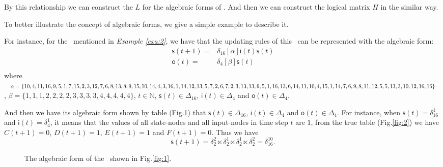 
By this relationship we can construct the $L$ for the algebraic forms of \BCNs. And then we can construct the logical matrix $H$ in the similar way. 




To better illustrate the concept of algebraic forms, we give a simple example to describe it.
\begin{example}
For instance, for the \BCN\ mentioned in {\em Example \ref{exa:2}}, we have that the updating rules of this \BCN\ can be represented with the algebraic form:
\begin{equation*}
\begin{split}
\mathsf{s}(t+1) =&\delta_{16}[\alpha]\mathsf{i}(t)\mathsf{s}(t)\\
\mathsf{o}(t) =&\delta_4[\beta]\mathsf{s}(t)\\
\end{split}
\label{equ:4}
\end{equation*}
where $\alpha=\{10,4,11,16,9,5,1, 7,15,2,3,12,7,6,8,13,8,9,\\15,10,14,4,3,16,1,14,12,13,5,7,2,6,7,2,3,13,13,9,5,1,\\16,13 ,6,14,11,10,4,15,1,14 ,7,6,9 ,8,11,12,5,5,13,3,10,\\12,16,16\}$, $\beta=\{1,1,1,2,2,2,2,3,3,3,3,4,4,4,4,4\}$, $t\in \mathbb{N}$, $\mathsf{s}(t)\in \Delta_{16}$, $\mathsf{i}(t)\in \Delta_4$ and $\mathsf{o}(t)\in \Delta_4$.

And then we have its algebraic form shown by table (Fig.\ref{fig:6}) that $\mathsf{s}(t)\in \Delta_{16}$, $\mathsf{i}(t)\in \Delta_4$ and $\mathsf{o}(t)\in \Delta_4$. For instance, when $\mathsf{s}(t)=\delta_{16}^1$ and  $\mathsf{i}(t)=\delta_{4}^1$, it means that the values of all state-nodes and all input-nodes in time step $t$ are $1$,  from the true table (Fig.\ref{fig:2}) we have $C(t+1)=0$, $D(t+1)=1$, $E(t+1)=1$ and $F(t+1)=0$. Thus we have \[\mathsf{s}(t+1)=\delta_{2}^2 \ltimes \delta_{2}^1 \ltimes \delta_{2}^1 \ltimes \delta_{2}^2=\delta_{16}^{10}.\]
 \begin{figure}[thpb]
      \centering
      
      \caption{The algebraic form of the \BCN\ shown in Fig.\ref{fig:1}.}
      \label{fig:6}
   \end{figure}
   \label{exa:3}
\end{example}   
